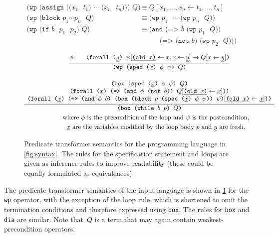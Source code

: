 \documentclass[fleqn]{llncs}
\newcommand{\code}[1]{\texttt{#1}}
\newcommand{\xs}{\underline x}
\newcommand{\ys}{\underline y}
\begin{document}
\begin{figure}[t]
    \begin{align*}
\code{(wp (assign (($x_1$ $t_1$) $\cdots$ ($x_n$ $t_n$))) $Q$)}
    & \equiv Q[x_1,\ldots,x_n \gets t_1,\ldots,t_n]
    \\
\code{(wp (block $p_1 \cdots p_n$ $Q$)}
    & \equiv \code{(wp $p_1$ $\cdots$ (wp $p_n$ $Q$))}
    \\
\code{(wp (if $b$ $p_1$ $p_2$) $Q$)}
    & \equiv        \code{(and (=> $b$ (wp $p_1$ $Q$))} \\
    & \hspace{30pt} \code{     (=> (not $b$) (wp $p_2$ $Q$)))}
    \end{align*}

    \begin{gather*}
\infer{\code{(wp (spec ($\xs$) $\phi$ $\psi$) $Q$)}}
{   \phi
 && \code{(forall ($\ys$) $\psi[\underline{\code{(old $x$)}} \gets \xs, \xs \gets \ys]
                            \to Q[\xs \gets \ys]$)}
              }
    \\[1em]
\infer{\code{(box (while $b$ $p$) $Q$)}}
{   
\begin{array}{c}
   \code{(box (spec ($\xs$) $\phi$ $\psi$) $Q$)} \\
   \code{(forall ($\xs$) (=> (and $\phi$ (not $b$)) $Q[\underline{\code{(old $x$)}} \gets \xs]$))} \\
   \code{(forall ($\xs$) (=> (and $\phi$ $b$) (box (block $p$ (spec ($\xs$) $\phi$ $\psi$)) $\psi$)$[\underline{\code{(old $x$)}} \gets \xs]$))}
\end{array}}
    \\
        \qquad \text{where $\phi$ is the precondition of the loop and $\psi$ is the postcondition,} \\
        \qquad \text{$\xs$ are the variables modified by the loop body~$p$ and $\ys$ are fresh.}
    \end{gather*}
    \label{fig:semantics}
    \caption{Predicate transformer semantics for the programming language in \cref{fig:syntax}.
             The rules for the specification statement and loops are given as inference rules
             to improve readability (these could be equally formulated as equivalences).}
\end{figure}

The predicate transformer semantics of the input language is shown in \cref{fig:semantics} for the \code{wp} operator,
with the exception of the loop rule, which is shortened to omit the termination conditions
and therefore expressed using \code{box}. The rules for \code{box} and \code{dia} are similar.
Note that~$Q$ is a term that may again contain weakest-precondition operators.
\end{document}

